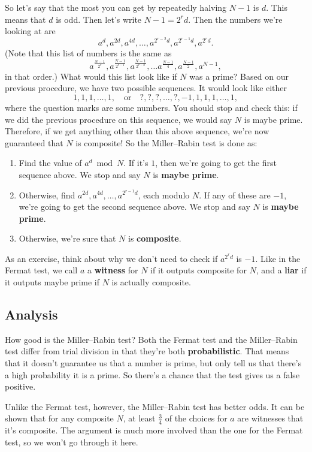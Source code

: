 \documentclass[11pt,paper=letter]{scrartcl}
\begin{document}
So let's say that the most you can get by repeatedly halving $N-1$ is $d$. This means that $d$ is odd. Then let's write $N-1 = 2^r d$. Then the numbers we're looking at are
$$a^{d}, a^{2d}, a^{4d}, \ldots, a^{2^{r-2}d}, a^{2^{r-1}d}, a^{2^rd}.$$
(Note that this list of numbers is the same as
$$a^{\frac{N-1}{2^r}}, a^{\frac{N-1}{2^{r-1}}}, a^{\frac{N-1}{2^{r-2}}}, \ldots a^{\frac{N-1}{4}}, a^{\frac{N-1}{2}}, a^{N-1},$$
in that order.) What would this list look like if $N$ was a prime? Based on our previous procedure, we have two possible sequences. It would look like either
$$1, 1, 1, \ldots, 1,\quad\text{or}\quad \text{?}, \text{?}, \text{?}, \ldots, \text{?}, -1, 1, 1, 1, \ldots, 1,$$
where the question marks are some numbers. You should stop and check this: if we did the previous procedure on this sequence, we would say $N$ is maybe prime. Therefore, if we get anything other than this above sequence, we're now guaranteed that $N$ is composite! So the Miller--Rabin test is done as:
\begin{enumerate}
  \item Find the value of $a^{d} \bmod N$. If it's $1$, then we're going to get the first sequence above. We stop and say $N$ is \textbf{maybe prime}.
  \item Otherwise, find $a^{2d}, a^{4d}, \ldots, a^{2^{r-1}d}$, each modulo $N$. If any of these are $-1$, we're going to get the second sequence above. We stop and say $N$ is \textbf{maybe prime}.
  \item Otherwise, we're sure that $N$ is \textbf{composite}.
\end{enumerate}
As an exercise, think about why we don't need to check if $a^{2^rd}$ is $-1$. Like in the Fermat test, we call $a$ a \textbf{witness} for $N$ if it outputs composite for $N$, and a \textbf{liar} if it outputs maybe prime if $N$ is actually composite.

\subsection{Analysis}

How good is the Miller--Rabin test? Both the Fermat test and the Miller--Rabin test differ from trial division in that they're both \textbf{probabilistic}. That means that it doesn't guarantee us that a number is prime, but only tell us that there's a high probability it is a prime. So there's a chance that the test gives us a false positive.

Unlike the Fermat test, however, the Miller--Rabin test has better odds. It can be shown that for any composite $N$, at least $\frac34$ of the choices for $a$ are witnesses that it's composite. The argument is much more involved than the one for the Fermat test, so we won't go through it here.
\end{document}
